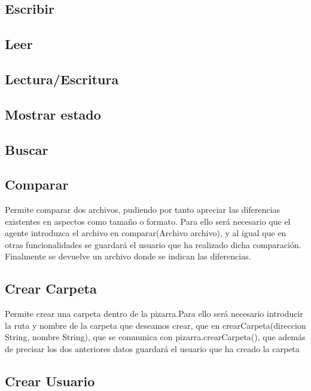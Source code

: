 \subsection{Escribir}
\subsection{Leer}
\subsection{Lectura/Escritura}
\subsection{Mostrar estado}
\subsection{Buscar}

\subsection{Comparar}
Permite comparar dos archivos, pudiendo por tanto apreciar las diferencias existentes en  aspectos como tamaño o formato. Para ello será necesario que el agente introduzca el archivo en comparar(Archivo archivo), y al igual que en otras funcionalidades se guardará el usuario que ha realizado dicha comparación. Finalmente se devuelve un archivo donde se indican las diferencias.
\subsection{Crear Carpeta}
Permite crear una carpeta dentro de la pizarra.Para ello será necesario introducir la ruta y nombre de la carpeta que deseamos crear, que en crearCarpeta(direccion String, nombre String), que se comuunica con pizarra.crearCarpeta(), que además de precisar los dos anteriores datos guardará el usuario que ha creado la carpeta
\subsection{Crear Usuario}
